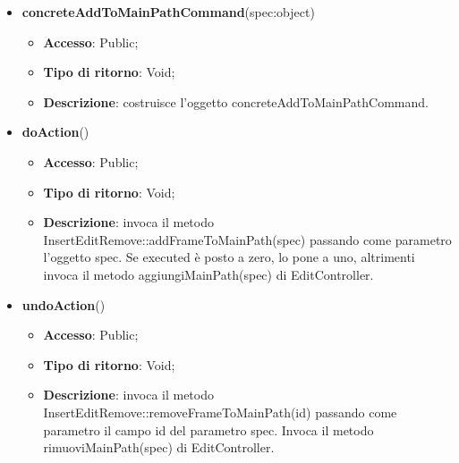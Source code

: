 {{{				
				\begin{itemize}
					\item \textbf{concreteAddToMainPathCommand}(spec:object)
					\begin{itemize}
						\item \textbf{Accesso}: Public;
						\item \textbf{Tipo di ritorno}: Void;
						\item \textbf{Descrizione}: costruisce l’oggetto concreteAddToMainPathCommand.
					\end{itemize}
					\item \textbf{doAction}()
					\begin{itemize}
						\item \textbf{Accesso}: Public;
						\item \textbf{Tipo di ritorno}: Void;
						\item \textbf{Descrizione}: invoca il metodo InsertEditRemove::addFrameToMainPath(spec) passando come parametro l'oggetto spec. Se executed è posto a zero, lo pone a uno, altrimenti invoca il metodo aggiungiMainPath(spec) di EditController.
					\end{itemize}
					\item \textbf{undoAction}()
					\begin{itemize}
						\item \textbf{Accesso}: Public;
						\item \textbf{Tipo di ritorno}: Void;
						\item \textbf{Descrizione}: invoca il metodo InsertEditRemove::removeFrameToMainPath(id) passando come parametro il campo id del parametro spec. Invoca il metodo rimuoviMainPath(spec) di EditController.
					\end{itemize}
				\end{itemize}
				}
				
}}
